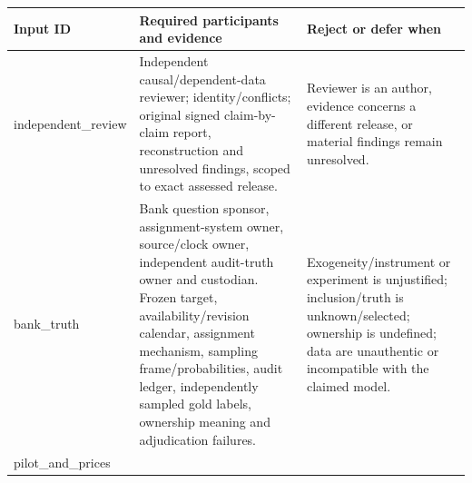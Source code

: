 \documentclass[
  11pt,
  a4paper,
]{article}
\begin{document}
\begin{longtable}[]{@{}lll@{}}
\toprule
\begin{minipage}[b]{0.30\columnwidth}\raggedright
Input ID\strut
\end{minipage} & \begin{minipage}[b]{0.30\columnwidth}\raggedright
Required participants and evidence\strut
\end{minipage} & \begin{minipage}[b]{0.30\columnwidth}\raggedright
Reject or defer when\strut
\end{minipage}\tabularnewline
\midrule
\endhead
\begin{minipage}[t]{0.30\columnwidth}\raggedright
independent\_review\strut
\end{minipage} & \begin{minipage}[t]{0.30\columnwidth}\raggedright
Independent causal/dependent-data reviewer; identity/conflicts; original
signed claim-by-claim report, reconstruction and unresolved findings,
scoped to exact assessed release.\strut
\end{minipage} & \begin{minipage}[t]{0.30\columnwidth}\raggedright
Reviewer is an author, evidence concerns a different release, or
material findings remain unresolved.\strut
\end{minipage}\tabularnewline
\begin{minipage}[t]{0.30\columnwidth}\raggedright
bank\_truth\strut
\end{minipage} & \begin{minipage}[t]{0.30\columnwidth}\raggedright
Bank question sponsor, assignment-system owner, source/clock owner,
independent audit-truth owner and custodian. Frozen target,
availability/revision calendar, assignment mechanism, sampling
frame/probabilities, audit ledger, independently sampled gold labels,
ownership meaning and adjudication failures.\strut
\end{minipage} & \begin{minipage}[t]{0.30\columnwidth}\raggedright
Exogeneity/instrument or experiment is unjustified; inclusion/truth is
unknown/selected; ownership is undefined; data are unauthentic or
incompatible with the claimed model.\strut
\end{minipage}\tabularnewline
\begin{minipage}[t]{0.30\columnwidth}\raggedright
pilot\_and\_prices\strut
\end{minipage} & \begin{minipage}[t]{0.30\columnwidth}\raggedright

\end{minipage}
\end{longtable}
\end{document}
